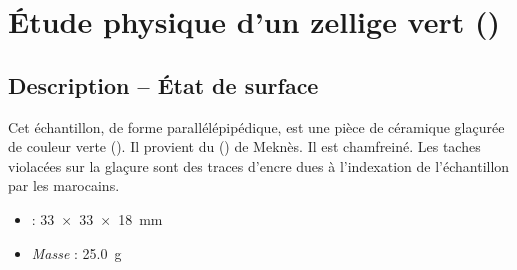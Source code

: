 
\chapter{Étude physique d'un zellige vert ()}

\section{Description -- État de surface}

Cet échantillon, de forme parallélépipédique, est une pièce de 
céramique glaçurée de couleur verte (). 
Il provient du \PaM () de Meknès. 
Il est chamfreiné. Les taches violacées sur la glaçure sont des 
traces d'encre dues à l'indexation de l'échantillon par les marocains.

\begin{itemize}
  \item \DimText : \SI{33x33x18}{\mm}
  \item \emph{Masse} : \SI{25.0}{\g}
\end{itemize}

